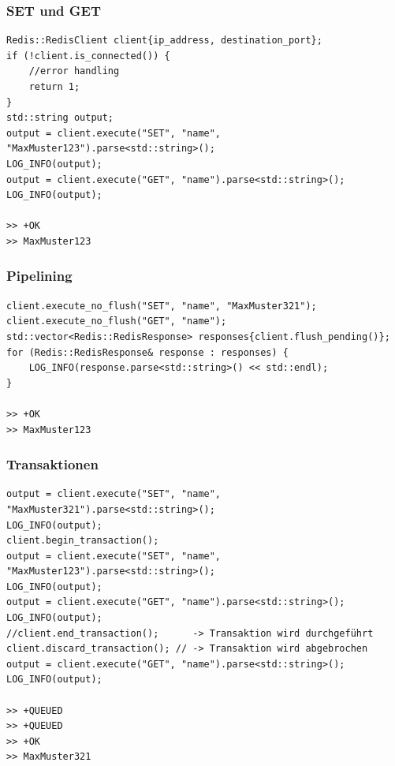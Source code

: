 \documentclass[12pt, letterpaper]{article}
\newenvironment{code}{\captionsetup{type=listing}}{}
\begin{document}
\newpage

\subsubsection{SET und GET}
\begin{code}
\begin{verbatim}
Redis::RedisClient client{ip_address, destination_port};
if (!client.is_connected()) {
    //error handling
    return 1;
}
std::string output;
output = client.execute("SET", "name", "MaxMuster123").parse<std::string>();
LOG_INFO(output);
output = client.execute("GET", "name").parse<std::string>();
LOG_INFO(output);

>> +OK
>> MaxMuster123
\end{verbatim}  
\end{code}

\subsubsection{Pipelining}
\begin{code}
\begin{verbatim}
client.execute_no_flush("SET", "name", "MaxMuster321");
client.execute_no_flush("GET", "name");
std::vector<Redis::RedisResponse> responses{client.flush_pending()};
for (Redis::RedisResponse& response : responses) {
    LOG_INFO(response.parse<std::string>() << std::endl);
}

>> +OK
>> MaxMuster123
\end{verbatim}  
\end{code}



\subsubsection{Transaktionen}
\begin{code}
\begin{verbatim}
output = client.execute("SET", "name", "MaxMuster321").parse<std::string>();
LOG_INFO(output);
client.begin_transaction();
output = client.execute("SET", "name", "MaxMuster123").parse<std::string>();
LOG_INFO(output);
output = client.execute("GET", "name").parse<std::string>();
LOG_INFO(output);
//client.end_transaction();      -> Transaktion wird durchgeführt
client.discard_transaction(); // -> Transaktion wird abgebrochen
output = client.execute("GET", "name").parse<std::string>();
LOG_INFO(output);
    
>> +QUEUED
>> +QUEUED
>> +OK
>> MaxMuster321
\end{verbatim}  
\end{code}
\end{document}
